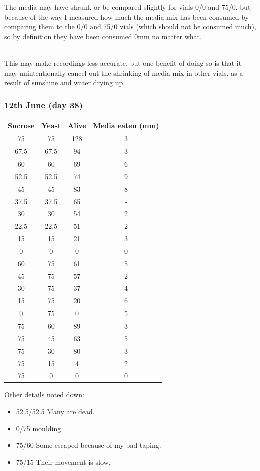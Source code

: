 \documentclass{article}
\begin{document}
\noindent
The media may have shrunk or be compared slightly for vials 0/0 and 75/0, but because of the way I measured how much the media mix has been consumed by comparing them to the 0/0 and 75/0 vials (which should not be consumed much), so by definition they have been consumed 0mm no matter what.

\noindent\\
This may make recordings less accurate, but one benefit of doing so is that it may unintentionally cancel out the shrinking of media mix in other vials, as a result of sunshine and water drying up.

\subsubsection{12th June (day 38)\\}

{
\centering
\begin{tabular}{|c|c|c|c|}
  \hline
  Sucrose & Yeast & Alive & Media eaten (mm)\\
  \hline
  \hline
  75 & 75 & 128 & 3\\
  67.5 & 67.5 & 94 & 3\\
  60 & 60 & 69 & 6\\
  52.5 & 52.5 & 74 & 9\\
  45 & 45 & 83 & 8\\
  37.5 & 37.5 & 65 & -\\
  30 & 30 & 54 & 2\\
  22.5 & 22.5 & 51 & 2\\
  15 & 15 & 21 & 3\\
  0 & 0 & 0 & 0\\
  \hline
  60 & 75 & 61 & 5\\
  45 & 75 & 57 & 2\\
  30 & 75 & 37 & 4\\
  15 & 75 & 20 & 6\\
  0 & 75 & 0 & 5\\
  \hline
  75 & 60 & 89 & 3\\
  75 & 45 & 63 & 5\\
  75 & 30 & 80 & 3\\
  75 & 15 & 4 & 2\\
  75 & 0 & 0 & 0\\
  \hline
\end{tabular}
\par
}

\newpage
\noindent
Other details noted down:

\begin{itemize}
  \item 52.5/52.5 Many are dead.
  \item 0/75 moulding.
  \item 75/60 Some escaped because of my bad taping.
  \item 75/15 Their movement is slow.
\end{itemize}
\end{document}
